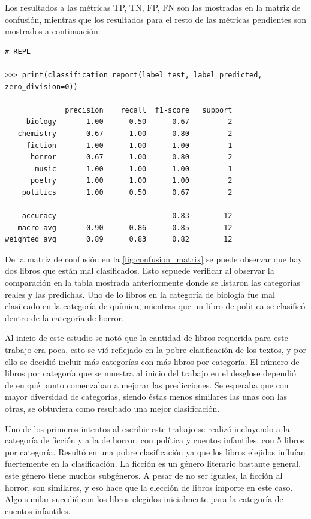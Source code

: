 Los resultados a las métricas TP, TN, FP, FN son las mostradas en la matriz de confusión, mientras que los resultados para el resto de las métricas pendientes son mostrados a continuación:
\begin{verbatim}
# REPL

>>> print(classification_report(label_test, label_predicted, zero_division=0))

              precision    recall  f1-score   support
     biology       1.00      0.50      0.67         2
   chemistry       0.67      1.00      0.80         2
     fiction       1.00      1.00      1.00         1
      horror       0.67      1.00      0.80         2
       music       1.00      1.00      1.00         1
      poetry       1.00      1.00      1.00         2
    politics       1.00      0.50      0.67         2

    accuracy                           0.83        12
   macro avg       0.90      0.86      0.85        12
weighted avg       0.89      0.83      0.82        12
\end{verbatim}

De la matriz de confusión en la \cref{fig:confusion_matrix} se puede observar que hay dos libros que están mal clasificados. Esto sepuede verificar al observar la comparación en la tabla mostrada anteriormente donde se listaron las categorías reales y las predichas. Uno de lo libros en la categoría de biología fue mal clasiicado en la categoría de química, mientras que un libro de política se clasificó dentro de la categoría de horror.

Al inicio de este estudio se notó que la cantidad de libros requerida para este trabajo era poca, esto se vió reflejado en la pobre clasificación de los textos, y por ello se decidió incluir más categorías con más libros por categoría. El número de libros por categoría que se muestra al inicio del trabajo en el desglose dependió de en qué punto comenzaban a mejorar las predicciones. Se esperaba que con mayor diversidad de categorías, siendo éstas menos similares las unas con las otras, se obtuviera como resultado una mejor clasificación. 

Uno de los primeros intentos al escribir este trabajo se realizó incluyendo a la categoría de ficción y a la de horror, con política y cuentos infantiles, con 5 libros por categoría. Resultó en una pobre clasificación ya que los libros elejidos influían fuertemente en la clasificación. La ficción es un género literario bastante general, este género tiene muchos subgéneros. A pesar de no ser iguales, la ficción al horror, son similares, y eso hace que la elección de libros importe en este caso. Algo similar sucedió con los libros elegidos inicialmente para la categoría de cuentos infantiles.

